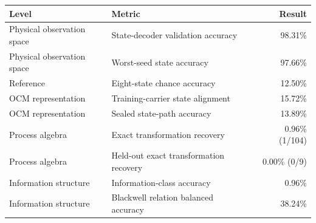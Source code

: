 \begin{tabular}{llr}
\toprule
Level & Metric & Result \\
\midrule
Physical observation space & State-decoder validation accuracy & 98.31\% \\
Physical observation space & Worst-seed state accuracy & 97.66\% \\
Reference & Eight-state chance accuracy & 12.50\% \\
OCM representation & Training-carrier state alignment & 15.72\% \\
OCM representation & Sealed state-path accuracy & 13.89\% \\
Process algebra & Exact transformation recovery & 0.96\% (1/104) \\
Process algebra & Held-out exact transformation recovery & 0.00\% (0/9) \\
Information structure & Information-class accuracy & 0.96\% \\
Information structure & Blackwell relation balanced accuracy & 38.24\% \\
\bottomrule
\end{tabular}
